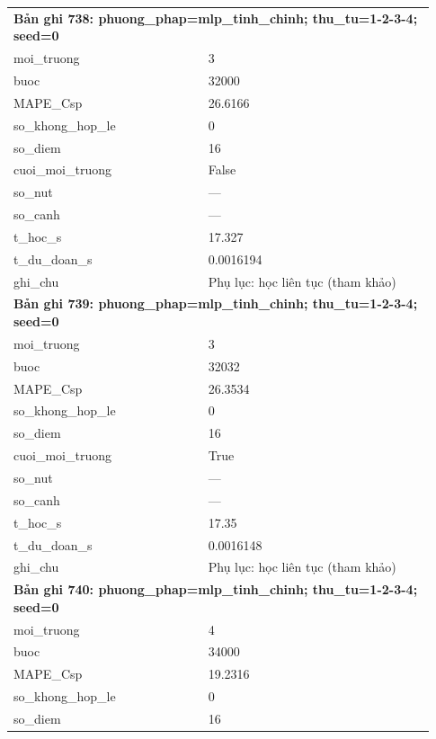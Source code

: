 \begin{longtable}{p{0.43\linewidth}p{0.50\linewidth}}
\midrule
\multicolumn{2}{p{0.95\linewidth}}{\textbf{Bản ghi 738: phuong\_phap=mlp\_tinh\_chinh; thu\_tu=1-2-3-4; seed=0}} \\
moi\_\allowbreak truong & 3 \\
buoc & 32000 \\
MAPE\_\allowbreak Csp & 26.6166 \\
so\_\allowbreak khong\_\allowbreak hop\_\allowbreak le & 0 \\
so\_\allowbreak diem & 16 \\
cuoi\_\allowbreak moi\_\allowbreak truong & False \\
so\_\allowbreak nut & — \\
so\_\allowbreak canh & — \\
t\_\allowbreak hoc\_\allowbreak s & 17.327 \\
t\_\allowbreak du\_\allowbreak doan\_\allowbreak s & 0.0016194 \\
ghi\_\allowbreak chu & Phụ lục: học liên tục (tham khảo) \\
\midrule
\multicolumn{2}{p{0.95\linewidth}}{\textbf{Bản ghi 739: phuong\_phap=mlp\_tinh\_chinh; thu\_tu=1-2-3-4; seed=0}} \\
moi\_\allowbreak truong & 3 \\
buoc & 32032 \\
MAPE\_\allowbreak Csp & 26.3534 \\
so\_\allowbreak khong\_\allowbreak hop\_\allowbreak le & 0 \\
so\_\allowbreak diem & 16 \\
cuoi\_\allowbreak moi\_\allowbreak truong & True \\
so\_\allowbreak nut & — \\
so\_\allowbreak canh & — \\
t\_\allowbreak hoc\_\allowbreak s & 17.35 \\
t\_\allowbreak du\_\allowbreak doan\_\allowbreak s & 0.0016148 \\
ghi\_\allowbreak chu & Phụ lục: học liên tục (tham khảo) \\
\midrule
\multicolumn{2}{p{0.95\linewidth}}{\textbf{Bản ghi 740: phuong\_phap=mlp\_tinh\_chinh; thu\_tu=1-2-3-4; seed=0}} \\
moi\_\allowbreak truong & 4 \\
buoc & 34000 \\
MAPE\_\allowbreak Csp & 19.2316 \\
so\_\allowbreak khong\_\allowbreak hop\_\allowbreak le & 0 \\
so\_\allowbreak diem & 16 \\

\end{longtable}
